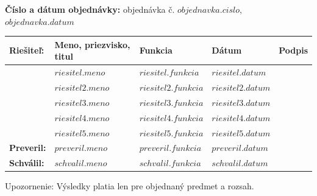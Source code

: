 \begin{titlepage}
  {\hspace*{0em}\textbf{Číslo a dátum objednávky: }\textnormal{objednávka č. $objednavka.cislo$, $objednavka.datum$}}

\vspace*{0em}
  \begin{table}[h!] %
\centering
\renewcommand{\arraystretch}{1.25} %
  \begin{tabular}{|l|l|l|l|l|}
\hline
   \textbf{Riešiteľ:} & \textbf{Meno, priezvisko, titul} & \textbf{Funkcia}     & \textbf{Dátum}     & \textbf{Podpis} \\ \hline
\multirow{5}{*}{}  & $riesitel.meno$                     & $riesitel.funkcia$   & $riesitel.datum$   &                 \\ \cline{2-5}
                   & $riesitel2.meno$                    & $riesitel2.funkcia$  & $riesitel2.datum$  &                 \\ \cline{2-5}
                   & $riesitel3.meno$                    & $riesitel3.funkcia$  & $riesitel3.datum$  &                 \\ \cline{2-5}
                   & $riesitel4.meno$                    & $riesitel4.funkcia$  & $riesitel4.datum$  &                 \\ \cline{2-5}
                   & $riesitel5.meno$                    & $riesitel5.funkcia$  & $riesitel5.datum$  &                 \\ \hline
\textbf{Preveril:} & $preveril.meno$                     & $preveril.funkcia$   & $preveril.datum$   &                 \\ \hline
\textbf{Schválil:} & $schvalil.meno$                     & $schvalil.funkcia$   & $schvalil.datum$   &                 \\ \hline
\end{tabular}
\end{table}


{Upozornenie: Výsledky platia len pre objednaný predmet a rozsah.}

\end{titlepage}


